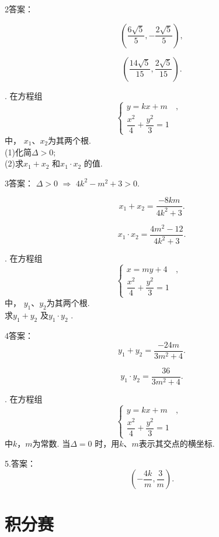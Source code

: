 \documentclass[UTF8]{ctexart}
\begin{document}
   
2答案： 

$$(\dfrac{6\sqrt5}{5},-\dfrac{2\sqrt5}{5}),$$
 
$$(\dfrac{14\sqrt5}{15},\dfrac{2\sqrt5}{15}).$$


\newpage

. 在方程组\begin{equation*}
\left\{
\begin{aligned}
 y=kx+m&,& \\
\dfrac{x^2}{4}+\dfrac{y^2}3=1 & &
\end{aligned}
\right.
\end{equation*}中， $x_1$、$x_2$为其两个根. \\
 (1)化简$\Delta>0$;\\
 (2)求$x_1+x_2$ 和$x_1\cdot x_2$ 的值.
\vspace{3cm}

  
  3答案：
  $\Delta>0$ $\Rightarrow$ $4k^2-m^2+3>0.$
    
  $$x_1+ x_2=\dfrac{-8km}{4k^2+3}.$$
  
  $$x_1\cdot x_2=\dfrac{4m^2-12}{4k^2+3}.$$

\newpage


 . 在方程组\begin{equation*}
\left\{
\begin{aligned}
x=my+4 &,& \\
\dfrac{x^2}{4}+\dfrac{y^2}3=1 & &
\end{aligned}
\right.
\end{equation*}中， $y_1$、$y_2$为其两个根. \\
 求$y_1+y_2$ 及$y_1\cdot y_2$ .
\vspace{3cm}

   
4答案：    
$$y_1+ y_2=\dfrac{-24m}{3m^2+4}.$$
  
$$y_1\cdot y_2=\dfrac{36}{3m^2+4}.$$

\newpage

. 在方程组\begin{equation*}
\left\{
\begin{aligned}
y=kx+m &,& \\
 \dfrac{x^2}4+\dfrac{y^2}3=1& &
\end{aligned}
\right.
\end{equation*}中$k$，$m$为常数.  当$\Delta=0$ 时，用$k$、$m$表示其交点的横坐标.
\vspace{3cm}

5.答案： $$(-\dfrac{4k}m,\dfrac3m).$$

  
\newpage
\section{积分赛} %
\end{document}
